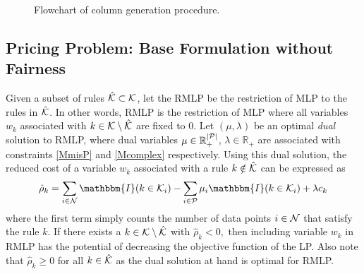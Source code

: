 \documentclass[twoside,11pt]{article}
\begin{document}
\begin{figure}[t]

\caption{\label{fig:cg_diagram} Flowchart of column generation procedure.}
\end{figure}



\subsection{Pricing Problem: Base Formulation without Fairness}
Given a subset of rules $\hat{\mathcal{K}}\subset\mathcal{K}$, let the RMLP be the restriction of MLP to the rules in $\hat {\mathcal{K}}$. In other words, RMLP is the restriction of MLP where all variables $w_k$ associated with $k\in\mathcal{K}\setminus\hat{\mathcal{K}}$ are fixed to 0. Let $(\mu,\lambda)$ be an optimal {\em dual} solution to RMLP, where dual variables $\mu \in \mathbb{R}_+^{\lvert\mathcal{P}\rvert}$, $\lambda \in \mathbb{R}_+$ are associated with constraints \eqref{MmisP} and \eqref{Mcomplex} respectively. Using this dual solution, the reduced cost of a variable $w_k$ associated with a rule $k\notin\hat{\mathcal{K}}$ can be expressed as
\begin{equation}
\hat \rho_k =  \sum_{i \in \mathcal{N}} \mathbbm{I}(k \in {\cal K}_i)
-\sum_{i \in \mathcal{P}}  \mu_i  \mathbbm{I}(k \in {\cal K}_i) +\lambda  c_k  \label{eq:redcost}
\end{equation}
where the first term simply counts the number of data points $i\in{\cal N}$ that satisfy the rule $k$.
If there exists a $k\in\mathcal{K}\setminus\hat{\mathcal{K}}$ with $\hat \rho_k<0,$ then including variable $w_k$ in RMLP has the potential of decreasing the objective function of the LP. Also note that $\hat \rho_k\geq0$ for all $k\in\hat{\mathcal{K}}$ as the dual solution at hand is optimal for RMLP.
\end{document}
